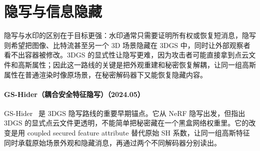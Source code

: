 \section{隐写与信息隐藏}

隐写与水印的区别在于目标更强：水印通常只需要证明所有权或恢复短消息，隐写则希望把图像、比特流甚至另一个 3D 场景隐藏在 3DGS 中，同时让外部观察者看不出容器被修改。3DGS 的显式性让隐写更难，因为攻击者可能直接拿到点云文件和高斯属性；因此这一路线的关键是把外观重建和秘密恢复解耦，让同一组高斯属性在普通渲染时像原场景，在秘密解码器下又能恢复隐藏内容。
\paragraph{GS-Hider（耦合安全特征隐写）（2024.05）}
GS-Hider~\cite{2405_15118} 是 3DGS 隐写路线的重要早期锚点。它从 NeRF 隐写出发，但指出 3DGS 的显式点云文件更透明，不能简单把秘密藏在一个黑盒网络权重里。它的改变是用 coupled secured feature attribute 替代原始 SH 系数，让同一组高斯特征同时承载原始场景外观和隐藏消息，再通过两个不同解码器分别读出。

